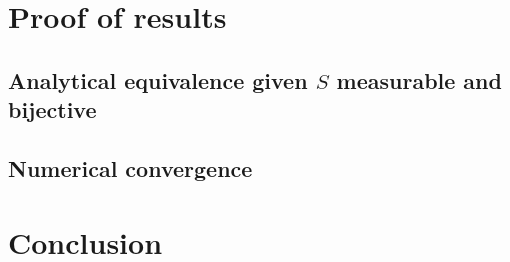 \documentclass[NETN,manuscript]{stjour-new}
\begin{document}
\section{Proof of results}

\subsection{Analytical equivalence given $S$ measurable and bijective}
\label{sec:proof-equivalence}

\subsection{Numerical convergence}

\section{Conclusion}

\acknowledgments


% 



\end{document}
